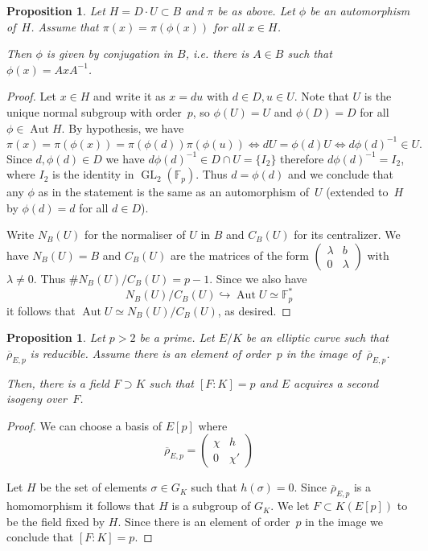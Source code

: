 \documentclass[12pt]{amsart}
\newcommand{\F}{\mathbb{F}}
\newcommand{\rhobar}{{\overline{\rho}}}
\DeclareMathOperator{\Aut}{Aut}
\newcommand{\GL}{\operatorname{GL}}
\numberwithin{equation}{section}
\newtheorem{proposition}[theorem]{Proposition}
\theoremstyle{definition}
\theoremstyle{remark}
\begin{document}
\begin{proposition} \label{P:inner}
Let $H = D \cdot U \subset B$ and $\pi$ be as above. 
Let $\phi$ be an automorphism of~$H$. Assume that  
$\pi(x) = \pi(\phi(x))$ for all $x \in H$. 

Then $\phi$ is given by conjugation in $B$, i.e. there is $A \in B$ such that $\phi(x) = AxA^{-1}$. 
\end{proposition}
\begin{proof}
Let $x \in H$ and write it as $x = du$ with $d \in D, u \in U$.
Note that $U$ is the unique normal subgroup with order~$p$, so 
$\phi(U) = U$ and $\phi(D)=D$ for all $\phi \in \Aut H$.
By hypothesis, we have 
\[
 \pi(x) = \pi(\phi(x)) = \pi(\phi(d))\pi(\phi(u)) \iff dU = \phi(d)U
 \iff d\phi(d)^{-1} \in U.
\]
Since $d, \phi(d) \in D$ we have $d\phi(d)^{-1} \in D \cap U = \{ I_2\}$ therefore $d\phi(d)^{-1} = I_2$, where $I_2$ is the identity in $\GL_2(\F_p)$.
Thus $d = \phi(d)$ and we conclude that any $\phi$ 
as in the statement is the same as an automorphism of~$U$ (extended to~$H$ by $\phi(d)=d$ for all $d\in D$). 

Write $N_B(U)$  for the normaliser of $U$ in $B$ and $C_B(U)$ for its centralizer. 
We have $N_B(U) = B$ 
and $C_B(U)$ are the matrices of the form $\left(\begin{smallmatrix}
                            \lambda & b \\
                            0 & \lambda
                            \end{smallmatrix} \right)$
with $\lambda \neq 0$. Thus $\# N_B(U)/C_B(U) = p-1$. 
Since  we also have 
\[
 N_B(U)/C_B(U) \hookrightarrow \Aut U \simeq \F_p^*
\]
it follows that $\Aut U \simeq N_B(U)/C_B(U)$, as desired.
\end{proof}

\begin{proposition} \label{P:fieldF}
Let $p > 2$ be a prime. Let $E/K$ be an elliptic curve such that 
$\rhobar_{E,p}$ is reducible. Assume there is an element of order~$p$ 
in the image of~$\rhobar_{E,p}$. 

Then, there is a field $F \supset K$ such that $[F : K] = p$ and $E$ acquires a 
second isogeny over~$F$.
\end{proposition}
\begin{proof} We can choose a basis of $E[p]$ where
\[
\rhobar_{E,p} =  \begin{pmatrix}
                            \chi& h \\
                            0 & \chi'
                            \end{pmatrix} \]

Let $H$ be the set of elements $\sigma \in  G_K$ such 
that $h(\sigma) = 0$. Since $\rhobar_{E,p}$ is a homomorphism it follows 
that $H$ is a subgroup of $G_K$. 
We let $F \subset K(E[p])$ to be the field fixed by $H$.
Since there is an element of order~$p$ in the image 
we conclude that $[F : K] =p$.
\end{proof}
\end{document}
